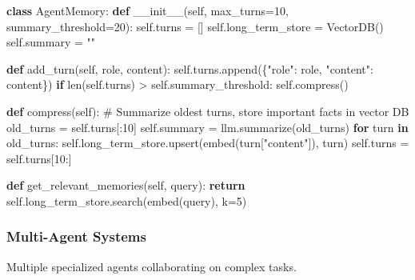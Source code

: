 \documentclass[11pt]{article}
\newenvironment{Shaded}{\begin{snugshade}}{\end{snugshade}}
\newcommand{\BuiltInTok}[1]{\textcolor[rgb]{0.50,0.55,0.55}{#1}}
\newcommand{\CommentTok}[1]{\textcolor[rgb]{0.48,0.49,0.49}{#1}}
\newcommand{\ControlFlowTok}[1]{\textcolor[rgb]{0.99,0.74,0.29}{\textbf{#1}}}
\newcommand{\DecValTok}[1]{\textcolor[rgb]{0.96,0.45,0.00}{#1}}
\newcommand{\FunctionTok}[1]{\textcolor[rgb]{0.56,0.27,0.68}{#1}}
\newcommand{\KeywordTok}[1]{\textcolor[rgb]{0.81,0.81,0.76}{\textbf{#1}}}
\newcommand{\NormalTok}[1]{\textcolor[rgb]{0.81,0.81,0.76}{#1}}
\newcommand{\OperatorTok}[1]{\textcolor[rgb]{0.81,0.81,0.76}{#1}}
\newcommand{\StringTok}[1]{\textcolor[rgb]{0.96,0.31,0.31}{#1}}
\newcommand{\VariableTok}[1]{\textcolor[rgb]{0.15,0.68,0.68}{#1}}
\begin{document}
\begin{Shaded}
\begin{Highlighting}[]
\KeywordTok{class}\NormalTok{ AgentMemory:}
    \KeywordTok{def} \FunctionTok{\_\_init\_\_}\NormalTok{(}\VariableTok{self}\NormalTok{, max\_turns}\OperatorTok{=}\DecValTok{10}\NormalTok{, summary\_threshold}\OperatorTok{=}\DecValTok{20}\NormalTok{):}
        \VariableTok{self}\NormalTok{.turns }\OperatorTok{=}\NormalTok{ []}
        \VariableTok{self}\NormalTok{.long\_term\_store }\OperatorTok{=}\NormalTok{ VectorDB()}
        \VariableTok{self}\NormalTok{.summary }\OperatorTok{=} \StringTok{""}

    \KeywordTok{def}\NormalTok{ add\_turn(}\VariableTok{self}\NormalTok{, role, content):}
        \VariableTok{self}\NormalTok{.turns.append(\{}\StringTok{"role"}\NormalTok{: role, }\StringTok{"content"}\NormalTok{: content\})}
        \ControlFlowTok{if} \BuiltInTok{len}\NormalTok{(}\VariableTok{self}\NormalTok{.turns) }\OperatorTok{\textgreater{}} \VariableTok{self}\NormalTok{.summary\_threshold:}
            \VariableTok{self}\NormalTok{.compress()}

    \KeywordTok{def}\NormalTok{ compress(}\VariableTok{self}\NormalTok{):}
        \CommentTok{\# Summarize oldest turns, store important facts in vector DB}
\NormalTok{        old\_turns }\OperatorTok{=} \VariableTok{self}\NormalTok{.turns[:}\DecValTok{10}\NormalTok{]}
        \VariableTok{self}\NormalTok{.summary }\OperatorTok{=}\NormalTok{ llm.summarize(old\_turns)}
        \ControlFlowTok{for}\NormalTok{ turn }\KeywordTok{in}\NormalTok{ old\_turns:}
            \VariableTok{self}\NormalTok{.long\_term\_store.upsert(embed(turn[}\StringTok{"content"}\NormalTok{]), turn)}
        \VariableTok{self}\NormalTok{.turns }\OperatorTok{=} \VariableTok{self}\NormalTok{.turns[}\DecValTok{10}\NormalTok{:]}

    \KeywordTok{def}\NormalTok{ get\_relevant\_memories(}\VariableTok{self}\NormalTok{, query):}
        \ControlFlowTok{return} \VariableTok{self}\NormalTok{.long\_term\_store.search(embed(query), k}\OperatorTok{=}\DecValTok{5}\NormalTok{)}
\end{Highlighting}
\end{Shaded}

\subsubsection{Multi-Agent Systems}\label{multi-agent-systems}

Multiple specialized agents collaborating on complex tasks.
\end{document}
